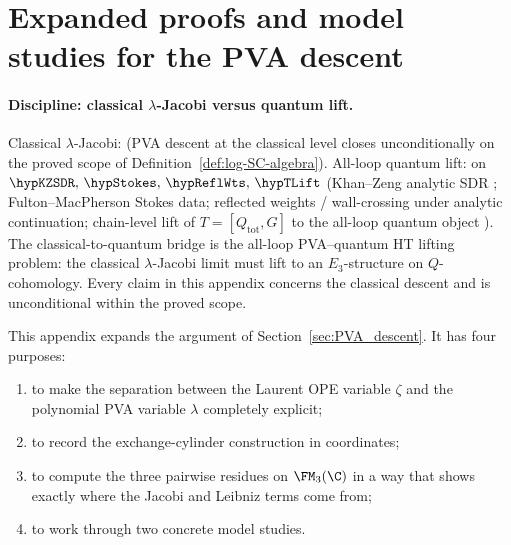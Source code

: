 
\section{Expanded proofs and model studies for the PVA descent}
\label{app:pva-expanded-repaired}

\paragraph{Discipline: classical $\lambda$-Jacobi versus quantum lift.}
Classical $\lambda$-Jacobi: \ClaimStatusProvedHere{} (PVA descent at the
classical level closes unconditionally on the proved scope of
Definition~\ref{def:log-SC-algebra}). All-loop quantum lift:
\ClaimStatusConditional{} on
$\hypKZSDR,\,\hypStokes,\,\hypReflWts,\,\hypTLift$
(Khan--Zeng analytic SDR \cite{KZ25}; Fulton--MacPherson Stokes data;
reflected weights / wall-crossing under analytic continuation;
chain-level lift of $T = [Q_{\mathrm{tot}}, G]$ to the all-loop quantum
object \cite{Costello2011Renorm,CG17,LurieHA}). The classical-to-quantum
bridge is the all-loop PVA--quantum HT lifting problem: the classical
$\lambda$-Jacobi limit must lift to an $E_3$-structure on
$Q$-cohomology. Every claim in this appendix concerns the classical
descent and is unconditional within the proved scope.

This appendix expands the argument of
Section~\ref{sec:PVA_descent}. It has four purposes:

\begin{enumerate}[label=\textup{(\alph*)}]
\item to make the separation between the Laurent OPE variable $\zeta$ and the
 polynomial PVA variable $\lambda$ completely explicit;
\item to record the exchange-cylinder construction in coordinates;
\item to compute the three pairwise residues on $\FM_3(\C)$ in a way that shows
 exactly where the Jacobi and Leibniz terms come from;
\item to work through two concrete model studies.
\end{enumerate}

